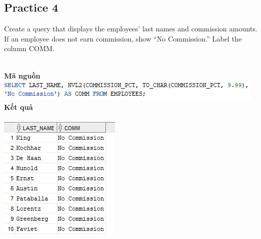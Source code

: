 \documentclass[12pt,a4paper]{report}
\begin{document}
\subsection{Practice 4}
\begin{boxedminipage}[t]{15.5cm}
Create a query that displays the employees’ last names and commission amounts. 
If an employee does not earn commission, show “No Commission.” Label the column COMM.
\end{boxedminipage}
\newline
\\
\textbf{Mã nguồn}
\\
\newline
\includegraphics[scale=1]{45.jpg}\\
\textbf{Kết quả}\\\\
\includegraphics[scale=1]{k45.jpg}
\end{document}
